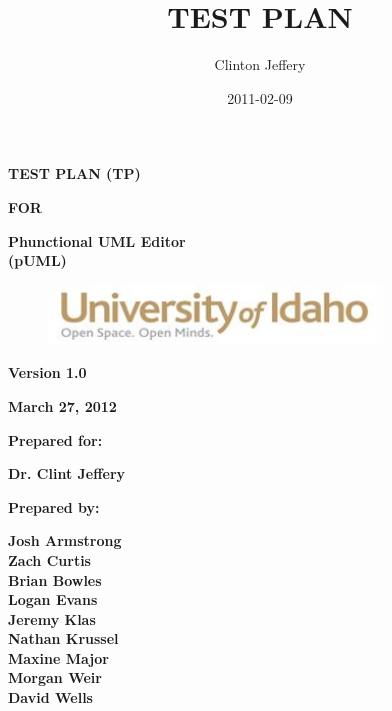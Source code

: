 \documentclass[twoside,letterpaper]{article}
\title{TEST PLAN}
\author{Clinton Jeffery}
\date{2011-02-09}
\begin{document}
\clearpage\setcounter{page}{1}\pagestyle{Standard}
\thispagestyle{FirstPage}

{\centering\bfseries
TEST PLAN (TP)
\par}

{\centering\bfseries
FOR
\par}


\bigskip

{\centering\bfseries
Phunctional UML Editor
\\(pUML)
\par}


\bigskip


\bigskip


\bigskip

{\centering \par}

\begin{figure}
\centering
\includegraphics[width=3.5in]{uidahologo.jpg}
\end{figure}

\bigskip


\bigskip


\bigskip


\bigskip


{\centering\bfseries
Version 1.0
\par}

{\centering\bfseries
March 27, 2012
\par}


\bigskip


\bigskip

{\centering\bfseries
Prepared for:
\par}

{\centering\bfseries
Dr. Clint Jeffery
\par}


\bigskip



{\centering\bfseries
Prepared by:
\par}

{\centering\bfseries
Josh Armstrong
\\Zach Curtis
\\Brian Bowles
\\Logan Evans
\\Jeremy Klas
\\Nathan Krussel
\\Maxine Major
\\Morgan Weir
\\David Wells
\par}
\end{document}
